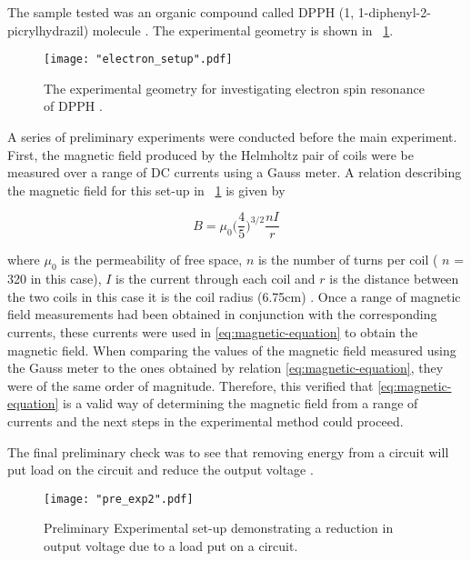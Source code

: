 \documentclass{article}
\newcommand{\figref}[2][\figurename~]{#1\ref{#2}}
\begin{document}
The sample tested was an organic compound called DPPH (1, 1-diphenyl-2-picrylhydrazil) molecule \cite{Paper02}. The experimental geometry is shown in \figref{fig:electron_setup}. 

\begin{figure}[h]
\centering
\texttt{[image: "electron\_setup".pdf]}
\caption{The experimental geometry for investigating electron spin resonance of DPPH \cite{Paper02}.}
\label{fig:electron_setup}
\end{figure}

\vspace{2mm}
\noindent
A series of preliminary experiments were conducted before the main experiment. First, the magnetic field produced by the Helmholtz pair of coils were be measured over a range of DC currents using a Gauss meter. A relation describing the magnetic field for this set-up in \figref{fig:electron_setup} is given by

\begin{equation}
\label{eq:magnetic-equation}
B = \mu_0\Bigg(\frac{4}{5}\Bigg)^{3/2}\frac{nI}{r}
\end{equation}

\vspace{2mm}
\noindent
where $\mu_0$ is the permeability of free space, $n$ is the number of turns per coil ( $n$ = 320 in this case), $I$ is the current through each coil and $r$ is the distance between the two coils in this case it is the coil radius (6.75cm) \cite{Paper02}. Once a range of magnetic field measurements had been obtained in conjunction with the corresponding currents, these currents were used in \eqref{eq:magnetic-equation} to obtain the magnetic field. When comparing the values of the magnetic field measured using the Gauss meter to the ones obtained by relation \eqref{eq:magnetic-equation}, they were of the same order of magnitude. Therefore, this verified that \eqref{eq:magnetic-equation} is a valid way of determining the magnetic field from a range of currents and the next steps in the experimental method could proceed.

\vspace{2mm}
\noindent
The final preliminary check was to see that removing energy from a circuit will put load on the circuit and reduce the output voltage \cite{Paper02}.

\begin{figure}[h]
\centering
\texttt{[image: "pre\_exp2".pdf]}
\caption{Preliminary Experimental set-up demonstrating a reduction in output voltage due to a load put on a circuit.}
\label{fig:pre_exp2}
\end{figure}
\end{document}
